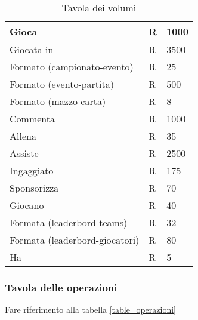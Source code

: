 \documentclass{article}
\begin{document}
\begin{table}
\begin{tabularx}{\textwidth}{|l|X|X|}
Gioca & R & 1000 \\ \hline %
Giocata in & R & 3500 \\ \hline %
Formato (campionato-evento) & R & 25 \\ \hline  %
Formato (evento-partita) & R & 500 \\ \hline %
Formato (mazzo-carta) & R & 8 \\ \hline %
Commenta & R & 1000 \\ \hline %
Allena  & R & 35 \\ \hline %
Assiste & R & 2500 \\ \hline %
Ingaggiato & R & 175 \\ \hline %
Sponsorizza & R & 70 \\ \hline %
Giocano & R & 40 \\ \hline %
Formata (leaderbord-teams) & R & 32 \\ \hline %
Formata (leaderbord-giocatori) & R & 80 \\ \hline %
Ha & R & 5 \\ \hline %
\end{tabularx}
\caption{Tavola dei volumi}
\label{table_volumi}
\end{table}

\subsubsection{Tavola delle operazioni}
Fare riferimento alla tabella \ref{table_operazioni}
\end{document}
